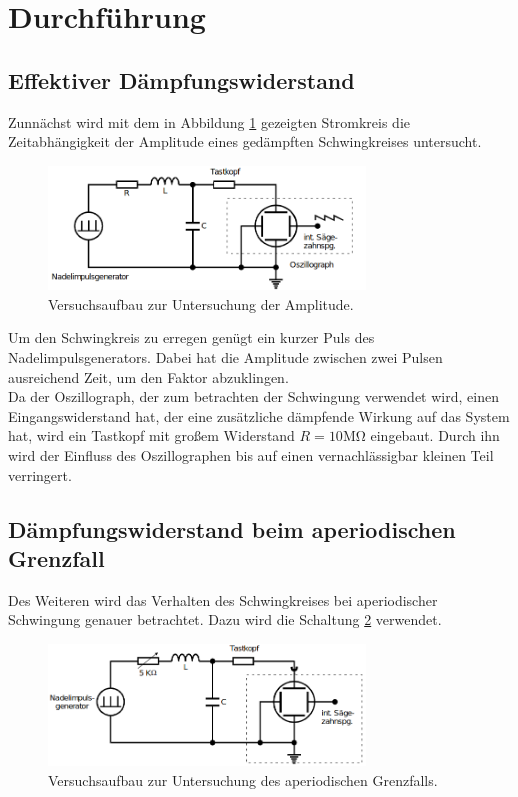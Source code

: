 \section{Durchführung}
\label{sec:Durchführung}

\subsection{Effektiver Dämpfungswiderstand}
    Zunnächst wird mit dem in Abbildung \ref{fig:5a} gezeigten Stromkreis
    die Zeitabhängigkeit der Amplitude eines gedämpften Schwingkreises 
    untersucht.\\
    \begin{figure}
        \centering
        \includegraphics[width=0.75\textwidth]{5a.png}
        \caption{Versuchsaufbau zur Untersuchung der Amplitude.\cite{anleitung}}
        \label{fig:5a}
    \end{figure}

    \noindent Um den Schwingkreis zu erregen genügt ein kurzer Puls des 
    Nadelimpulsgenerators. Dabei hat die Amplitude zwischen zwei Pulsen 
    ausreichend Zeit, um den Faktor %
    abzuklingen.\\
    Da der Oszillograph, der zum betrachten der Schwingung verwendet wird,
    einen Eingangswiderstand hat, der eine zusätzliche dämpfende Wirkung
    auf das System hat, wird ein Tastkopf mit großem Widerstand $R = 10 \si{\mega\ohm}$
    eingebaut. Durch ihn wird der Einfluss des Oszillographen bis auf einen
    vernachlässigbar kleinen Teil verringert. 

\subsection{Dämpfungswiderstand beim aperiodischen Grenzfall}
    Des Weiteren wird das Verhalten des Schwingkreises bei aperiodischer 
    Schwingung genauer betrachtet. Dazu wird die Schaltung \ref{fig:5b} 
    verwendet.\\

    \begin{figure}
        \centering
        \includegraphics[width=0.75\textwidth]{5b.png}
        \caption{Versuchsaufbau zur Untersuchung des aperiodischen Grenzfalls.\cite{anleitung}}
        \label{fig:5b}
    \end{figure}

